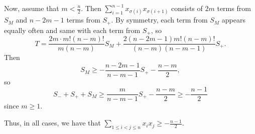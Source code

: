 Now, assume that $m<\frac{n}{2}$. Then $\displaystyle\sum_{i=1}^{n-1}x_{\sigma\left(i\right)}x_{\sigma\left(i+1\right)}$ consists of $2m$ terms from $S_M$ and $n-2m-1$ terms from $S_+$. By symmetry, each term from $S_M$ appears equally often and same with each term from $S_+$, so \[T=\frac{2m\cdot m!\left(n-m\right)!}{m\left(n-m\right)}S_M+\frac{2\left(n-2m-1\right)m!\left(n-m\right)!}{\left(n-m\right)\left(n-m-1\right)}S_+.\] Then \[S_M\geq-\frac{n-2m-1}{n-m-1}S_+-\frac{n-m}{2},\] so \[S_-+S_++S_M\geq\frac{m}{n-m-1}S_+-\frac{n-m}{2}\geq-\frac{n-1}{2}\] since $m\geq1$.

Thus, in all cases, we have that $\displaystyle\sum_{1\leq i<j\leq n}x_ix_j\geq-\frac{n-1}{2}$.